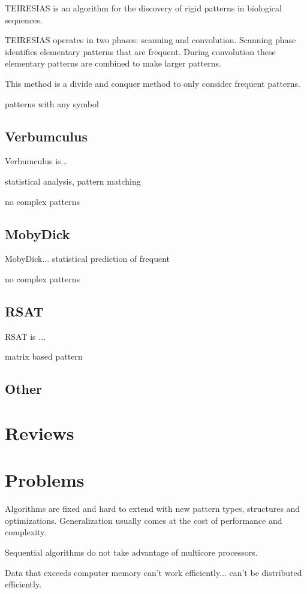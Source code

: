 TEIRESIAS\cite{TEIRESIAS} is an algorithm for the discovery of rigid patterns in biological sequences. 

TEIRESIAS operates in two phases: scanning and convolution. Scanning phase identifies elementary patterns that are frequent. During convolution these elementary patterns are combined to make larger patterns.

This method is a divide and conquer method to only consider frequent patterns.

patterns with any symbol 


\subsection{Verbumculus}

Verbumculus\cite{Verbumculus} is...

statistical analysis, pattern matching

no complex patterns


\subsection{MobyDick}

MobyDick\cite{MobyDick}...
statistical prediction of frequent

no complex patterns


\subsection{RSAT}

RSAT\cite{RSAT} is ...

matrix based pattern


\subsection{Other}

\cite{NetworkMotifsDiscovery, GenericMotifSequential}

\section{Reviews}

\cite{CombinatorialSubtle, SurveyDNAMotif, SurveyMotifDiscovery}


\section{Problems}

\WIP

Algorithms are fixed and hard to extend with new pattern types, structures and optimizations. Generalization usually comes at the cost of performance and complexity. 

Sequential algorithms do not take advantage of multicore processors. 

Data that exceeds computer memory can't work efficiently... can't be distributed efficiently. 